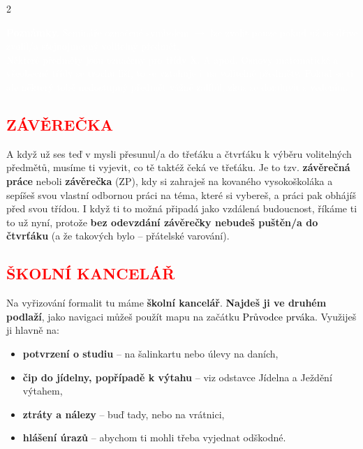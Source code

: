 \documentclass[a5paper, twoside]{article}
\newcommand{\podnadpis}[2]{
  \subsection*{\textcolor{#2}{#1}}
}
\begin{document}
\begin{multicols}{2}
  \begin{tcolorbox}[colback=red,boxrule=0pt, sharp corners]
		\textcolor{white}{\footnotesize \textbf{Poznámky.}
		Semináře označené symbolem $\rightarrow$ lze zvolit pouze pokud už sis dříve zvolil/a stejnojmenný
	volitelný předmět.\\
	Některé předměty jsou označeny pro třídy X. A apod. Osnovy matematické a všeobecné třídy se trochu liší,
	to se vztahuje i~na volitelné předměty. Pokud se ti ale některý tobě nedostupný předmět vážně zalíbil,
    zkus se domluvit s vedením.
      }
		\hfill
	\end{tcolorbox}
\end{multicols}
\newpage

\podnadpis{ZÁVĚREČKA}{red}
A když už ses teď v mysli přesunul/a do třeťáku a čtvrťáku k výběru volitelných předmětů, musíme ti vyjevit, co tě taktéž
čeká ve třeťáku. Je to tzv. \textbf{závěrečná práce} neboli \textbf{závěrečka} (ZP), kdy si zahraješ na kovaného
vysokoškoláka a sepíšeš svou vlastní odbornou práci na téma, které si vybereš, a práci pak obhájíš před svou třídou.
I když ti to možná připadá jako vzdálená budoucnost, říkáme ti to už nyní, protože \textbf{bez odevzdání závěrečky
nebudeš puštěn/a do čtvrťáku} (a že takových bylo -- přátelské varování).

\podnadpis{ŠKOLNÍ KANCELÁŘ}{red}

Na vyřizování formalit tu máme \textbf{školní kancelář}. \textbf{Najdeš ji ve druhém podlaží}, jako
navigaci můžeš použít mapu na začátku \textcolor{black}{\Kapitan Průvodce prváka}.
Využiješ ji hlavně na:
\begin{itemize}[leftmargin=10pt]
	\item \textbf{potvrzení o studiu} -- na šalinkartu nebo úlevy na daních,
	\item \textbf{čip do jídelny, popřípadě k výtahu} -- viz odstavce Jídelna a Ježdění výtahem,
	\item \textbf{ztráty a nálezy} -- buď tady, nebo na vrátnici,
	\item \textbf{hlášení úrazů} -- abychom ti mohli třeba vyjednat odškodné.
\end{itemize}
\end{document}
